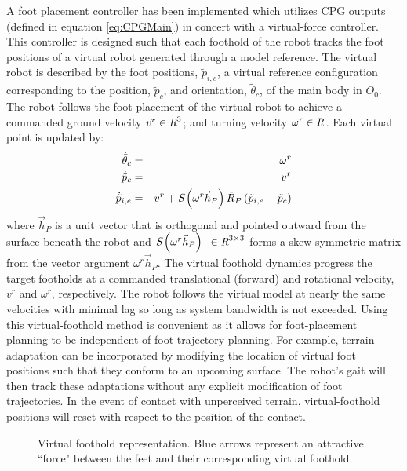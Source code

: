 		A foot placement controller has been implemented which utilizes CPG outputs (defined in equation \ref{eq:CPGMain}) in concert with a virtual-force controller. This controller is designed such that each foothold of the robot tracks the foot positions of a virtual robot generated through a model reference. The virtual robot is described by the foot positions, $\tilde{p}_{i,e}$, a virtual reference configuration corresponding to the position, $\tilde{p}_{c}$, and orientation, $\tilde{\theta}_{c}$, of the main body in $O_{0}$. The robot follows the foot placement of the virtual robot to achieve a commanded ground velocity $v^{r} \in\emph{R}^{3} $; and turning velocity $\omega^{r} \in\emph{R}^{}$. Each virtual point is updated by:
		\begin{eqnarray}
			\dot{\tilde{\theta}}_{c}	& = & \omega^{r} 	\nonumber\\
			\dot{\tilde{p}}_{c}			& = & v^{r}			\nonumber\\
			\dot{\tilde{p}}_{i,e} 		& = & v^{r} + \emph{S}\left(\omega^{r}\vec{h}_P\right) \tilde{R}_{P} \left(\tilde{p}_{i,e}-\tilde{p}_{c} \right) 
			\label{eq::virtual_foothold_control}
		\end{eqnarray}
		where $\vec{h}_P$ is a unit vector that is orthogonal and pointed outward from the surface beneath the robot and $\emph{S}\left(\omega^{r}\vec{h}_P\right)\text{ }\in \emph{R}^{3\times3}$ forms a skew-symmetric matrix from the vector argument $\omega^{r}\vec{h}_P$. The virtual foothold dynamics progress the target footholds at a commanded translational (forward) and rotational velocity, $v^{r}$ and $\omega^{r}$, respectively. The robot follows the virtual model at nearly the same velocities with minimal lag so long as system bandwidth is not exceeded. Using this virtual-foothold method is convenient as it allows for foot-placement planning to be independent of foot-trajectory planning. For example, terrain adaptation can be incorporated by modifying the location of virtual foot positions such that they conform to an upcoming surface. The robot's gait will then track these adaptations without any explicit modification of foot trajectories. In the event of contact with unperceived terrain, virtual-foothold positions will reset with respect to the position of the contact.
%
			\begin{figure}[h!]
				\centering
				\caption{ Virtual foothold representation. Blue arrows represent an attractive ``force" between the feet and their corresponding virtual foothold.}
				\label{fig::virtial_foothold}
			\end{figure}
